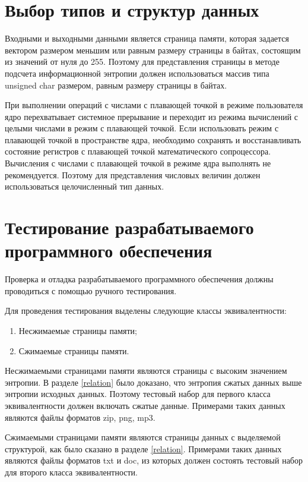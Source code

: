 \section{Выбор типов и структур данных}

Входными и выходными данными является страница памяти, которая задается вектором размером меньшим или равным размеру страницы в байтах, состоящим из значений от нуля до 255. Поэтому для представления страницы в методе подсчета информационной энтропии должен использоваться массив типа unsigned char размером, равным размеру страницы в байтах.

При выполнении операций с числами с плавающей точкой в режиме пользователя ядро перехватывает системное прерывание и переходит из режима вычислений с целыми числами в режим с плавающей точкой. Если использовать режим с плавающей точкой в пространстве ядра, необходимо сохранять и восстанавливать состояние регистров с плавающей точкой математического сопроцессора. Вычисления с числами с плавающей точкой в режиме ядра выполнять не рекомендуется. Поэтому для представления числовых величин должен использоваться целочисленный тип данных. 

\section{Тестирование разрабатываемого программного обеспечения}

Проверка и отладка разрабатываемого программного обеспечения должны проводиться с помощью ручного тестирования.

Для проведения тестирования выделены следующие классы эквивалентности:

\begin{enumerate}
	\item Несжимаемые страницы памяти;
	\item Сжимаемые страницы памяти.
\end{enumerate}

Несжимаемыми страницами памяти являются страницы с высоким значением энтропии. В разделе \ref{relation} было доказано, что энтропия сжатых данных выше энтропии исходных данных. Поэтому тестовый набор для первого класса эквивалентности должен включать сжатые данные. Примерами таких данных являются файлы форматов zip, png, mp3.

Сжимаемыми страницами памяти являются страницы данных с выделяемой структурой, как было сказано в разделе \ref{relation}. Примерами таких данных являются файлы форматов txt и doc, из которых должен состоять тестовый набор для второго класса эквивалентности.

